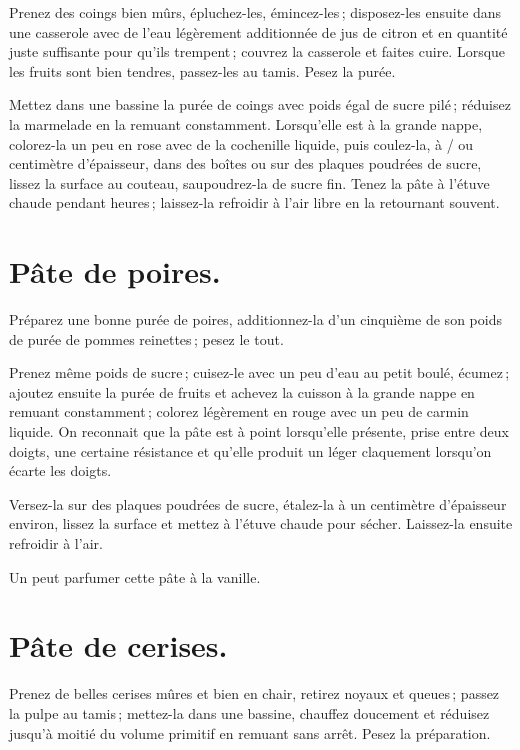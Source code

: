 Prenez des coings bien mûrs, épluchez-les, émincez-les ; disposez-les ensuite
dans une casserole avec de l'eau légèrement additionnée de jus de citron et en
quantité juste suffisante pour qu'ils trempent ; couvrez la casserole et faites
cuire. Lorsque les fruits sont bien tendres, passez-les au tamis. Pesez la
purée.

Mettez dans une bassine la purée de coings avec poids égal de sucre pilé ;
réduisez la marmelade en la remuant constamment. Lorsqu'elle est à la grande
nappe, colorez-la un peu en rose avec de la cochenille liquide, puis coulez-la,
à {\mmm}/{\mmm} ou {\mmm} centimètre d'épaisseur, dans des
boîtes ou sur des plaques poudrées de sucre, lissez la surface au couteau,
saupoudrez-la de sucre fin. Tenez la pâte à l'étuve chaude pendant {\mmm}
heures ; laissez-la refroidir à l'air libre en la retournant souvent.

\section*{\centering Pâte de poires.}
{}

Préparez une bonne purée de poires, additionnez-la d'un cinquième de son poids
de purée de pommes reinettes ; pesez le tout.

Prenez même poids de sucre ; cuisez-le avec un peu d’eau au petit boulé,
écumez ; ajoutez ensuite la purée de fruits et achevez la cuisson à la grande
nappe en remuant constamment ; colorez légèrement en rouge avec un peu de
carmin liquide. On reconnait que la pâte est à point lorsqu'elle présente,
prise entre deux doigts, une certaine résistance et qu'elle produit un léger
claquement lorsqu'on écarte les doigts.

Versez-la sur des plaques poudrées de sucre, étalez-la à un centimètre
d'épaisseur environ, lissez la surface et mettez à l'étuve chaude pour sécher.
Laissez-la ensuite refroidir à l'air.

\medskip

Un peut parfumer cette pâte à la vanille.

\section*{\centering Pâte de cerises.}
{}

Prenez de belles cerises mûres et bien en chair, retirez noyaux et queues ;
passez la pulpe au tamis ; mettez-la dans une bassine, chauffez doucement et
réduisez jusqu'à moitié du volume primitif en remuant sans arrêt. Pesez la
préparation.

